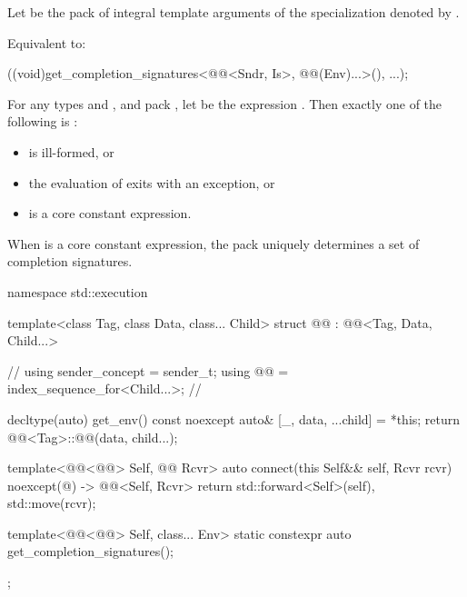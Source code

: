 \begin{itemdescr}
\pnum
Let  be the pack of integral template arguments of
the  specialization denoted by
.

\pnum
\effects
Equivalent to:
\begin{codeblock}
((void)get_completion_signatures<@@<Sndr, Is>, @@(Env)...>(), ...);
\end{codeblock}

\pnum
\begin{note}
For any types  and , and pack ,
let  be the expression
.
Then exactly one of the following is :
\begin{itemize}
\item {} is ill-formed, or
\item the evaluation of  exits with an exception, or
\item {} is a core constant expression.
\end{itemize}
When  is a core constant expression,
the pack  uniquely determines a set of completion signatures.
\end{note}
\end{itemdescr}

\pnum
\begin{codeblock}
namespace std::execution {
  template<class Tag, class Data, class... Child>
  struct @@ : @@<Tag, Data, Child...> {     // \expos
    using sender_concept = sender_t;
    using @@ = index_sequence_for<Child...>;           // \expos

    decltype(auto) get_env() const noexcept {
      auto& [_, data, ...child] = *this;
      return @@<Tag>::@@(data, child...);
    }

    template<@@<@@> Self, @@ Rcvr>
    auto connect(this Self&& self, Rcvr rcvr) noexcept(@\seebelow@)
      -> @@<Self, Rcvr> {
      return {std::forward<Self>(self), std::move(rcvr)};
    }

    template<@@<@@> Self, class... Env>
    static constexpr auto get_completion_signatures();
  };
}
\end{codeblock}

